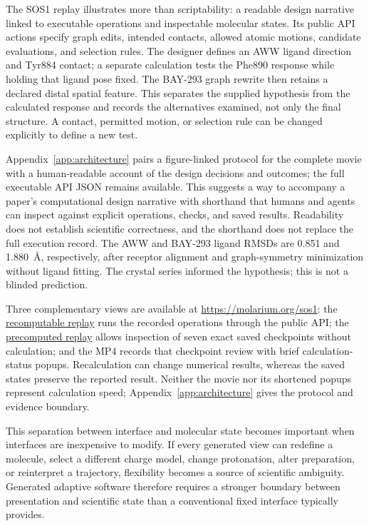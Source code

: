 \documentclass[11pt]{article}
\begin{document}
The SOS1 replay illustrates more than scriptability: a readable design narrative linked to executable operations and inspectable molecular states. Its public API actions specify graph edits, intended contacts, allowed atomic motions, candidate evaluations, and selection rules. The designer defines an AWW ligand direction and Tyr884 contact; a separate calculation tests the Phe890 response while holding that ligand pose fixed. The BAY-293 graph rewrite then retains a declared distal spatial feature. This separates the supplied hypothesis from the calculated response and records the alternatives examined, not only the final structure. A contact, permitted motion, or selection rule can be changed explicitly to define a new test. 

Appendix~\ref{app:architecture} pairs a figure-linked protocol for the complete movie with a human-readable account of the design decisions and outcomes; the full executable API JSON remains available. This suggests a way to accompany a paper's computational design narrative with shorthand that humans and agents can inspect against explicit operations, checks, and saved results. Readability does not establish scientific correctness, and the shorthand does not replace the full execution record. The AWW and BAY-293 ligand RMSDs are 0.851 and 1.880~\AA{}, respectively, after receptor alignment and graph-symmetry minimization without ligand fitting. The crystal series informed the hypothesis; this is not a blinded prediction.

Three complementary views are available at \url{https://molarium.org/sos1}: the \href{https://molarium.org/sos1-hit-to-bay293}{recomputable replay} runs the recorded operations through the public API; the \href{https://molarium.org/sos1-hit-to-bay293/review}{precomputed replay} allows inspection of seven exact saved checkpoints without calculation; and the MP4 records that checkpoint review with brief calculation-status popups. Recalculation can change numerical results, whereas the saved states preserve the reported result. Neither the movie nor its shortened popups represent calculation speed; Appendix~\ref{app:architecture} gives the protocol and evidence boundary.

This separation between interface and molecular state becomes important when interfaces are inexpensive to modify. If every generated view can redefine a molecule, select a different charge model, change protonation, alter preparation, or reinterpret a trajectory, flexibility becomes a source of scientific ambiguity. Generated adaptive software therefore requires a stronger boundary between presentation and scientific state than a conventional fixed interface typically provides.
\end{document}
